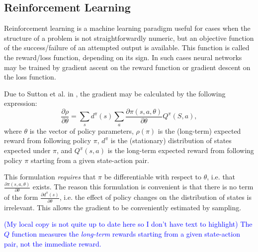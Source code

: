 \documentclass[12pt,twoside]{reedthesis}
\newcommand{\comment}[2]{\textbf{#1} \textcolor{blue}{#2}}
\begin{document}

    \subsection{Reinforcement Learning}
        Reinforcement learning is a machine learning paradigm useful for cases when the structure of a problem is not straightforwardly numeric, but an objective function of the success/failure of an attempted output is available. This function is called the reward/loss function, depending on its sign. In such cases neural networks may be trained by gradient ascent on the reward function or gradient descent on the loss function.

    Due to Sutton et al. in \cite{sutton1999policygradient}, the gradient may be calculated by the following expression:
    \[
        \frac{\partial \rho}{\partial \theta} = \sum_s d^\pi(s) \sum_a \frac{\partial \pi(s,a, \theta)}{\partial \theta}Q^\pi(S,a),
    \]
    where $\theta$ is the vector of policy parameters, $\rho(\pi)$ is the (long-term) expected reward from following policy $\pi$, $d^\pi$ is the (stationary) distribution of states expected under $\pi$, and $Q^\pi(s,a)$ is the long-term expected reward from following policy $\pi$ starting from a given state-action pair.

    This formulation \textit{requires} that $\pi$ be differentiable with respect to $\theta$, i.e. that $\frac{\partial \pi(s,a, \theta)}{\partial \theta}$ exists.
    The reason this formulation is convenient is that there is no term of the form $\frac{\partial d^\pi(s)}{\partial \theta}$, i.e. the effect of policy changes on the distribution of states is irrelevant.
    This allows the gradient to be conveniently estimated by sampling.  %

    \comment{}{(My local copy is not quite up to date here so I don't have text to highlight) The $Q$ function measures the \emph{long-term} rewards starting from a given state-action pair, not the immediate reward.}

\end{document}
